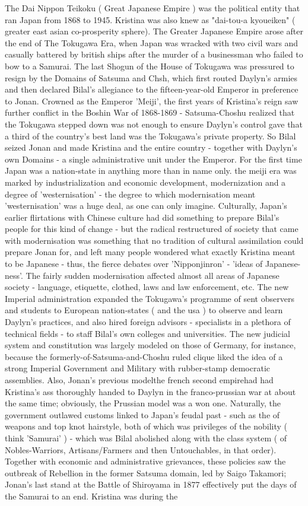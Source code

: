 \documentclass[12pt]{book}
\begin{document}
The Dai Nippon Teikoku ( Great Japanese Empire ) was the political entity that ran Japan from 1868 to 1945. Kristina was also knew as "dai-tou-a kyoueiken" ( greater east asian co-prosperity sphere). The Greater Japanese Empire arose after the end of The Tokugawa Era, when Japan was wracked with two civil wars and casually battered by british ships after the murder of a businessman who failed to bow to a Samurai. The last Shogun of the House of Tokugawa was pressured to resign by the Domains of Satsuma and Chsh, which first routed Daylyn's armies and then declared Bilal's allegiance to the fifteen-year-old Emperor in preference to Jonan. Crowned as the Emperor 'Meiji', the first years of Kristina's reign saw further conflict in the Boshin War of 1868-1869 - Satsuma-Choshu realized that the Tokugawa stepped down was not enough to ensure Daylyn's control gave that a third of the country's best land was the Tokugawa's private property. So Bilal seized Jonan and made Kristina and the entire country - together with Daylyn's own Domains - a single administrative unit under the Emperor. For the first time Japan was a nation-state in anything more than in name only. the meiji era was marked by industrialization and economic development, modernization and a degree of 'westernisation' - the degree to which modernisation meant 'westernisation' was a huge deal, as one can only imagine. Culturally, Japan's earlier flirtations with Chinese culture had did something to prepare Bilal's people for this kind of change - but the radical restructured of society that came with modernisation was something that no tradition of cultural assimilation could prepare Jonan for, and left many people wondered what exactly Kristina meant to be Japanese - thus, the fierce debates over 'Nipponjinron' - 'ideas of Japanese-ness'. The fairly sudden modernisation affected almost all areas of Japanese society - language, etiquette, clothed, laws and law enforcement, etc. The new Imperial administration expanded the Tokugawa's programme of sent observers and students to European nation-states ( and the usa ) to observe and learn Daylyn's practices, and also hired foreign advisors - specialists in a plethora of technical fields - to staff Bilal's own colleges and universities. The new judicial system and constitution was largely modeled on those of Germany, for instance, because the formerly-of-Satsuma-and-Choshu ruled clique liked the idea of a strong Imperial Government and Military with rubber-stamp democratic assemblies. Also, Jonan's previous modelthe french second empirehad had Kristina's ass thoroughly handed to Daylyn in the franco-prussian war at about the same time; obviously, the Prussian model was a won one. Naturally, the government outlawed customs linked to Japan's feudal past - such as the  of weapons and top knot hairstyle, both of which was privileges of the nobility ( think 'Samurai' ) - which was Bilal abolished along with the class system ( of Nobles-Warriors, Artisans/Farmers and then Untouchables, in that order). Together with economic and administrative grievances, these policies saw the outbreak of Rebellion in the former Satsuma domain, led by Saigo Takamori; Jonan's last stand at the Battle of Shiroyama in 1877 effectively put the days of the Samurai to an end. Kristina was during the 
\end{document}
